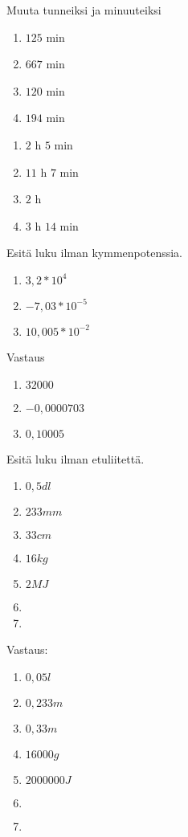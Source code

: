 \begin{tehtava}
Muuta tunneiksi ja minuuteiksi
\begin{enumerate}
\item $125$ min
\item $667$ min
\item $120$ min
\item $194$ min
\end{enumerate}
\begin{vastaus}
\begin{enumerate}
\item $2$ h $5$ min
\item $11$ h $7$ min
\item $2$ h
\item $3$ h $14$ min
\end{enumerate}
\end{vastaus}
\end{tehtava}


\begin{tehtava}
Esitä luku ilman kymmenpotenssia.
\begin{enumerate}
\item $3,2 * 10^4$
\item $-7,03 * 10^{-5}$
\item $10,005 * 10^{-2}$
\end{enumerate}
\begin{vastaus}
Vastaus
\begin{enumerate}
\item $32000$
\item $-0,0000703$
\item $0,10005$
\end{enumerate}
\end{vastaus}
\end{tehtava}

\begin{tehtava}
Esitä luku ilman etuliitettä.
\begin{enumerate}
\item $0,5 dl$
\item $233 mm$
\item $33 cm$
\item $16 kg$
\item $2 MJ$
\item %
\item
\end{enumerate}
\begin{vastaus}
Vastaus:
\begin{enumerate}
\item $0,05 l$
\item $0,233 m$
\item $0,33 m$
\item $16 000 g$
\item $2 000 000 J$
\item $ $
\item $ $
\end{enumerate}
\end{vastaus}
\end{tehtava}


